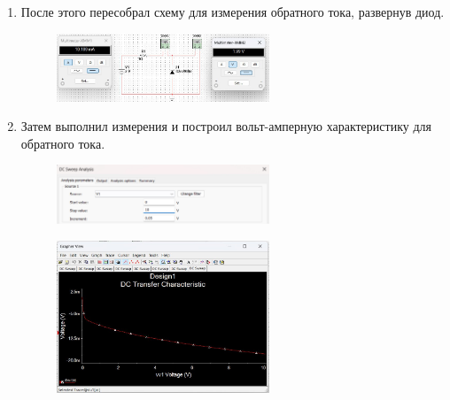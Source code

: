 \begin{enumerate}
	\item После этого пересобрал схему для измерения обратного тока, развернув диод.
	\begin{figure}[H]
		\centering
		\includegraphics[width=0.6\textwidth]{img/13.jpg}
	\end{figure}
	\item Затем выполнил измерения и построил вольт-амперную характеристику для обратного тока.
	\begin{figure}[H]
		\centering
		\includegraphics[width=0.6\textwidth]{img/dop_02.jpg}
	\end{figure}
	\begin{figure}[H]
		\centering
		\includegraphics[width=0.6\textwidth]{img/14.jpg}
	\end{figure}
\end{enumerate}
